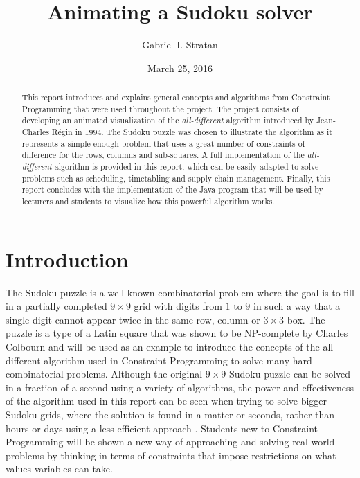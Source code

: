 \documentclass{l4proj}
\begin{document}
\title{Animating a Sudoku solver}
\author{Gabriel I. Stratan}
\date{March 25, 2016}
\maketitle

\begin{abstract}
This report introduces and explains general concepts and algorithms from Constraint Programming that were used throughout the project. The project consists of developing an animated visualization of the \textit{all-different} algorithm introduced by Jean-Charles R\'egin \cite{regin1994filtering} in 1994. The Sudoku puzzle was chosen to illustrate the algorithm as it represents a simple enough problem that uses a great number of constraints of difference for the rows, columns and sub-squares. A full implementation of the \textit{all-different} algorithm is provided in this report, which can be easily adapted to solve problems such as scheduling, timetabling and supply chain management. Finally, this report concludes with the implementation of the Java program that will be used by lecturers and students to visualize how this powerful algorithm works.
\end{abstract}

\educationalconsent
%
%
\tableofcontents
\chapter{Introduction}
\label{chap1intro}

\noindent The Sudoku puzzle is a well known combinatorial problem where the goal is to fill in a partially completed $9 \times 9$ grid with digits from $1$ to $9$ in such a way that a single digit cannot appear twice in the same row, column or $3\times 3$ box. The puzzle is a type of a Latin square that was shown to be NP-complete by Charles Colbourn \cite{colbourn1984complexity} and will be used as an example to introduce the concepts of the all-different algorithm used in Constraint Programming to solve many hard combinatorial problems. Although the original $9 \times 9$ Sudoku puzzle can be solved in a fraction of a second using a variety of algorithms, the power and effectiveness of the algorithm used in this report can be seen when trying to solve bigger Sudoku grids, where the solution is found in a matter or seconds, rather than hours or days using a less efficient approach \cite{stergiou1999difference}. Students new to Constraint Programming will be shown a new way of approaching and solving real-world problems by thinking in terms of constraints that impose restrictions on what values variables can take.
\end{document}
